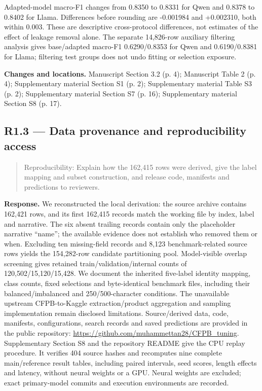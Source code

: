 \documentclass[11pt,a4paper]{article}
\begin{document}
Adapted-model macro-F1 changes from 0.8350 to 0.8331 for Qwen and 0.8378 to 0.8402 for Llama. Differences before rounding are -0.001984 and +0.002310, both within 0.003. These are descriptive cross-protocol differences, not estimates of the effect of leakage removal alone. The separate 14,826-row auxiliary filtering analysis gives base/adapted macro-F1 0.6290/0.8353 for Qwen and 0.6190/0.8381 for Llama; filtering test groups does not undo fitting or selection exposure.

\textbf{Changes and locations.} Manuscript Section 3.2 (p. 4); Manuscript Table 2 (p. 4); Supplementary material Section S1 (p. 2); Supplementary material Table S3 (p. 2); Supplementary material Section S7 (p. 16); Supplementary material Section S8 (p. 17).

\subsection*{R1.3 — Data provenance and reproducibility access}
\begin{quote}\small Reproducibility: Explain how the 162,415 rows were derived, give the label mapping and subset construction, and release code, manifests and predictions to reviewers.\end{quote}
\textbf{Response.} We reconstructed the local derivation: the source archive contains 162,421 rows, and its first 162,415 records match the working file by index, label and narrative. The six absent trailing records contain only the placeholder narrative “name”; the available evidence does not establish who removed them or when. Excluding ten missing-field records and 8,123 benchmark-related source rows yields the 154,282-row candidate partitioning pool. Model-visible overlap screening gives retained train/validation/internal counts of 120,502/15,120/15,428. We document the inherited five-label identity mapping, class counts, fixed selections and byte-identical benchmark files, including their balanced/imbalanced and 250/500-character conditions. The unavailable upstream CFPB-to-Kaggle extraction/product aggregation and sampling implementation remain disclosed limitations. Source/derived data, code, manifests, configurations, search records and saved predictions are provided in the public repository: \url{https://github.com/muhammettan28/CFPB_tuning}. Supplementary Section S8 and the repository README give the CPU replay procedure. It verifies 404 source hashes and recomputes nine complete main/reference result tables, including paired intervals, seed scores, length effects and latency, without neural weights or a GPU. Neural weights are excluded; exact primary-model commits and execution environments are recorded.
\end{document}
